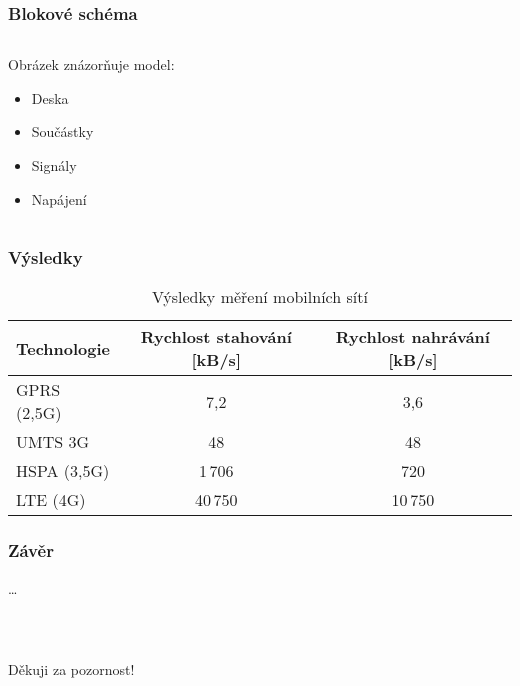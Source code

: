 \documentclass[%
  12pt,       				%
	t,                  %
	aspectratio=1610,   %
	unicode,						%
czech,              %
]{beamer}				    	%
\begin{document}
\begin{frame} 
	\frametitle{Blokové schéma}
	
	\begin{columns}[T] 								%
		\begin{column}{0.4\textwidth}		%
			Obrázek znázorňuje model:\\[2ex]
			\begin{itemize}
				\item Deska
				\item Součástky
				\item Signály
				\item Napájení
			\end{itemize}
		\end{column}
		\begin{column}{0.6\textwidth}		%
			\begin{figure}%
				\centering
				\vspace{1cm}	              %
				
			\end{figure}
		\end{column}
	\end{columns}											%
\end{frame}


\begin{frame} 
	\frametitle{Výsledky}
	\vspace{1cm}
	\begin{table}[]
		\centering
		\caption{Výsledky měření mobilních sítí}
		\label{tab:tabulka}
			\begin{tabular}{lcc}
				\toprule
					Technologie  & Rychlost stahování [kB/s] & Rychlost nahrávání [kB/s] \\
				\midrule
					GPRS (2,5G)	& 7,2 	& 3,6\\
					UMTS 3G     & 48 		& 48\\
					HSPA (3,5G)	&	1\,706	&	720\\
					LTE (4G) 		& 40\,750 & 10\,750\\
				\bottomrule                                       
			\end{tabular}
	\end{table}
\end{frame}


\begin{frame} 
	\frametitle{Závěr}
	\dots
\end{frame}


\begin{frame}[c] 
	\frametitle{\mbox{ }}
	\begin{center}
		{\Huge Děkuji za pozornost!}
	\end{center}
\end{frame}

\end{document}
